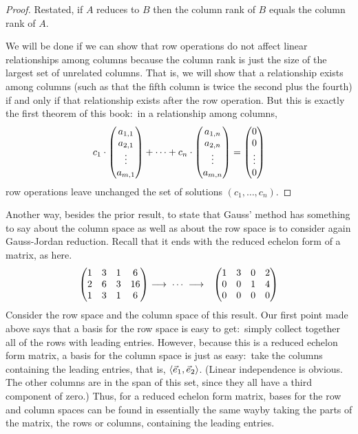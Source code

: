 \begin{proof}
Restated, if $A$ reduces to $B$ 
then the column rank of $B$ equals the column rank of $A$.

We will be done if we can show that row operations do not affect 
linear relationships among columns because the column rank is just the size
of the largest set of unrelated columns.
That is, we will show that a relationship exists among columns
(such as that the fifth column is twice the
second plus the fourth) if and only if that relationship exists after
the row operation. 
But this is exactly the first theorem of this book:~in a relationship
among columns,
\begin{equation*}
  c_1\cdot\begin{pmatrix} a_{1,1} \\ a_{2,1} \\ \vdots \\ a_{m,1} \end{pmatrix}
   +\dots+
  c_n\cdot \begin{pmatrix} a_{1,n} \\ a_{2,n} \\ \vdots \\ a_{m,n} \end{pmatrix}
   =\begin{pmatrix} 0 \\ 0 \\ \vdots \\ 0 \end{pmatrix}
\end{equation*}
row operations leave unchanged the set of solutions \( (c_1,\ldots,c_n) \).
\end{proof}

Another way, besides the prior result, to state that 
Gauss' method has something to say about the column space as well as about 
the row space is to consider again Gauss-Jordan reduction.
Recall that it ends with
the reduced echelon form of a matrix, as here.
\begin{eqnarray*}
  \begin{pmatrix}
    1  &3  &1  &6  \\
    2  &6  &3  &16 \\
    1  &3  &1  &6
  \end{pmatrix}
  &\mathrel{ \mathop{\longrightarrow}\limits^{\mathstrut}_{ \begin{subarray}{l} \relax \end{subarray}}}\;\cdots\;\mathrel{ \mathop{\longrightarrow}\limits^{\mathstrut}_{ \begin{subarray}{l} \relax \end{subarray}}}
  &\begin{pmatrix}
    1  &3  &0  &2  \\
    0  &0  &1  &4  \\
    0  &0  &0  &0
  \end{pmatrix}
\end{eqnarray*}
Consider the row space and the column space of this result.
Our first point made above says
that a basis for the row space is easy to
get:~simply collect together all of the rows with leading entries.
However, because this is a reduced echelon form matrix, 
a basis for the column space is just as easy:~take the
columns containing the leading entries, that is, 
\( \langle\vec{e}_1,\vec{e}_2\rangle \).
(Linear independence is obvious.
The other columns are in the span of 
this set, since they all have a third component of zero.)
Thus, for a reduced echelon form matrix, bases for the row and column spaces
can be found in essentially the same way\Dash by taking the parts of the 
matrix, the rows or columns, containing the leading entries.


